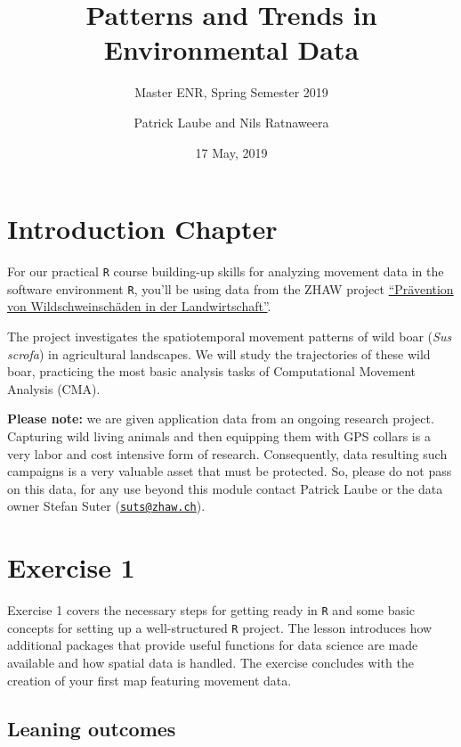 \documentclass[]{book}
\title{Patterns and Trends in Environmental Data}
\subtitle{Master ENR, Spring Semester 2019}
\author{Patrick Laube and Nils Ratnaweera}
\date{17 May, 2019}
\begin{document}
\maketitle

{
\setcounter{tocdepth}{1}
\tableofcontents
}
\chapter*{Introduction Chapter}\label{introduction-chapter}

For our practical \texttt{R} course building-up skills for analyzing
movement data in the software environment \texttt{R}, you'll be using
data from the ZHAW project
\href{https://www.zhaw.ch/de/lsfm/institute-zentren/iunr/integrative-oekologie/wildtiermanagement/referenzprojekte/}{``Prävention
von Wildschweinschäden in der Landwirtschaft''}.

The project investigates the spatiotemporal movement patterns of wild
boar (\emph{Sus scrofa}) in agricultural landscapes. We will study the
trajectories of these wild boar, practicing the most basic analysis
tasks of Computational Movement Analysis (CMA).

\textbf{Please note:} we are given application data from an ongoing
research project. Capturing wild living animals and then equipping them
with GPS collars is a very labor and cost intensive form of research.
Consequently, data resulting such campaigns is a very valuable asset
that must be protected. So, please do not pass on this data, for any use
beyond this module contact Patrick Laube or the data owner Stefan Suter
(\href{mailto:suts@zhaw.ch}{\nolinkurl{suts@zhaw.ch}}).

\chapter{Exercise 1}\label{exercise-1}

Exercise 1 covers the necessary steps for getting ready in \texttt{R}
and some basic concepts for setting up a well-structured \texttt{R}
project. The lesson introduces how additional packages that provide
useful functions for data science are made available and how spatial
data is handled. The exercise concludes with the creation of your first
map featuring movement data.

\section{Leaning outcomes}\label{leaning-outcomes}
\end{document}
